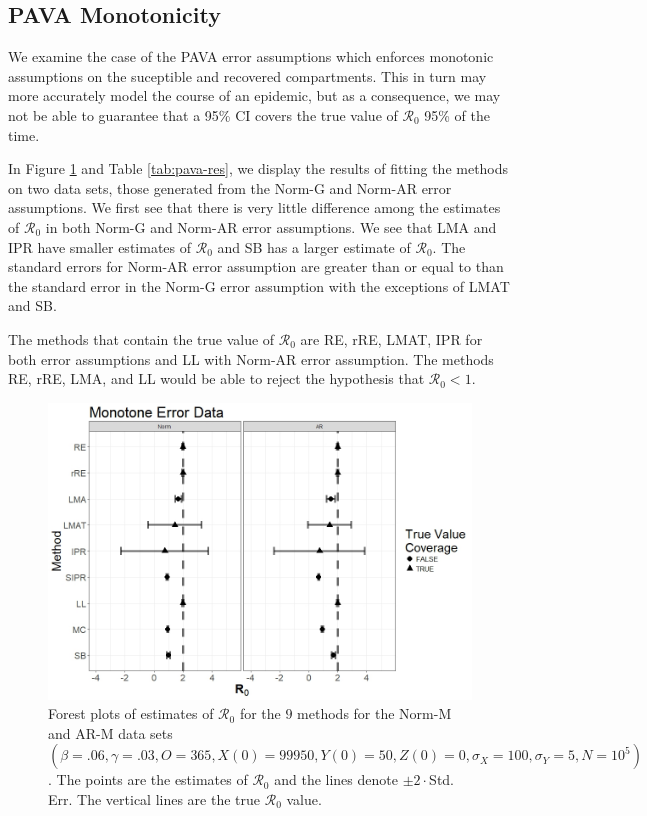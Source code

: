 \documentclass[12pt]{article}
\newcommand{\xxsir}{\ensuremath{9} } %
\newcommand{\rr}{\ensuremath{\mathcal{R}_0}}
\begin{document}
\subsection{PAVA Monotonicity}\label{sec:res-PAVA}
We examine the case of the PAVA error assumptions which enforces monotonic assumptions on the suceptible and recovered compartments.  This in turn may more accurately model the course of an epidemic, but as a consequence, we may not be able to guarantee that a 95\% CI covers the true value of $\rr$ 95\% of the time.

In Figure \ref{fig:pava-res} and Table \ref{tab:pava-res}, we display the results of fitting the methods on two data sets, those generated from the Norm-G and Norm-AR error assumptions.  We first see that there is very little difference among the estimates of $\rr$ in both Norm-G and Norm-AR error assumptions.  We see that LMA and IPR have smaller estimates of $\rr$ and SB has a larger estimate of $\rr$.  The standard errors for Norm-AR error assumption are greater than or equal to than the standard error in the Norm-G error assumption with the exceptions of LMAT and SB.

The methods that contain the true value of $\rr$ are RE, rRE, LMAT, IPR for both error assumptions and LL with Norm-AR error assumption.  The methods RE, rRE, LMA, and LL would be able to reject the hypothesis that $\rr < 1$.

\begin{figure}[H]
	\centering
	\includegraphics[scale=0.5]{images/mono.jpeg}
	\caption{Forest plots of estimates of $\rr$ for the \xxsir methods for the Norm-M and AR-M data sets $(\beta=.06, \gamma=.03, O=365, X(0)=99950, Y(0)=50, Z(0)=0, \sigma_X=100, \sigma_Y=5, N=10^5)$.  The points are the estimates of $\rr$ and the lines denote $\pm 2\cdot $Std. Err.  The vertical lines are the true $\rr$ value.}
	\label{fig:pava-res}
\end{figure}
\end{document}
